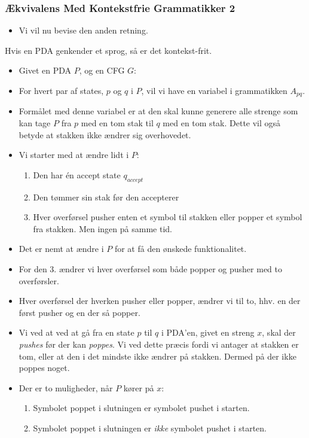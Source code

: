 \begin{frame}[allowframebreaks]
	\frametitle{Ækvivalens Med Kontekstfrie Grammatikker 2}
	\begin{itemize}
		\item Vi vil nu bevise den anden retning.
	\end{itemize}

	\begin{lemma}
		Hvis en PDA genkender et sprog, så er det kontekst-frit.
	\end{lemma}

	\begin{itemize}
		\item Givet en PDA $P$, og en CFG $G$:
		\item For hvert par af states, $p$ og $q$ i $P$, vil vi have en variabel i grammatikken $A_{pq}$.
		\item Formålet med denne variabel er at den skal kunne generere alle strenge som kan tage $P$ fra $p$ med en tom stak til $q$ med en tom stak. Dette vil også betyde at stakken ikke ændrer sig overhovedet.
		\item Vi starter med at ændre lidt i $P$:
		      \begin{enumerate}
			      \item Den har én accept state $q_{accept}$
			      \item Den tømmer sin stak før den accepterer
			      \item Hver overførsel pusher enten et symbol til stakken eller popper et symbol fra stakken. Men ingen på samme tid.
		      \end{enumerate}
		\item Det er nemt at ændre i $P$ for at få den ønskede funktionalitet.
		\item For den 3. ændrer vi hver overførsel som både popper og pusher med to overførsler.
		\item Hver overførsel der hverken pusher eller popper, ændrer vi til to, hhv. en der først pusher og en der så popper.
		\item Vi ved at ved at gå fra en state $p$ til $q$ i PDA'en, givet en streng $x$, skal der \textit{pushes} før der kan \textit{poppes}. Vi ved dette præcis fordi vi antager at stakken er tom, eller at den i det mindste ikke ændrer på stakken. Dermed på der ikke poppes noget.
		\item Der er to muligheder, når $P$ kører på $x$:
		      \begin{enumerate}
			      \item Symbolet poppet i slutningen er symbolet pushet i starten.
			      \item Symbolet poppet i slutningen er \textit{ikke} symbolet pushet i starten.
		      \end{enumerate}


\end{itemize}
\end{frame}
